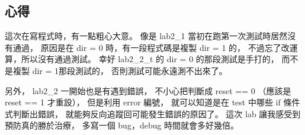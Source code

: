 \documentclass{article}
\begin{document}
\begin{CJK}{UTF8}{bsmi}
\section{心得}
這次在寫程式時，有一點粗心大意。
像是 lab2\_1 當初在跑第一次測試時居然沒有通過，
原因是在 dir = 0 時，有一段程式碼是複製 dir = 1 的，
不過忘了改運算，所以沒有通過測試。
幸好 lab2\_2\_t 的 dir = 0 的那段測試是手打的，
而不是複製 dir = 1那段測試的，
否則測試可能永遠測不出來了。

另外， lab2\_2 一開始也是有遇到錯誤，
不小心把判斷成 reset == 0 （應該是 reset == 1 才重設），
但是利用 error 編號，
就可以知道是在 test 中哪些  if 條件式判斷出錯誤，
就能夠反向追蹤回可能發生錯誤的原因了。
這次 lab 讓我感受到預防真的勝於治療，
多寫一個 bug，debug 時間就會多好幾倍。
\end{CJK}
\end{document}
